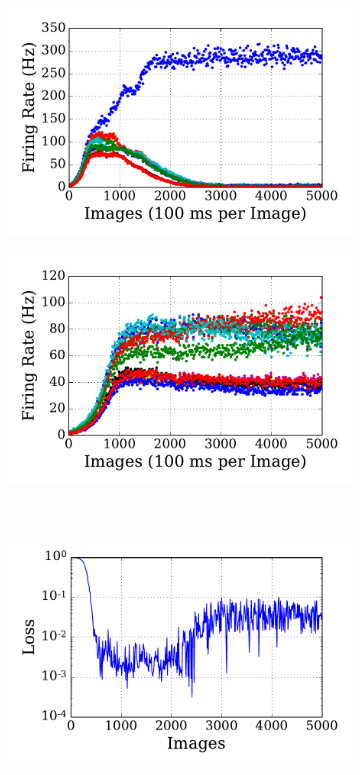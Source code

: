 \begin{figure}
\begin{subfigure}[t]{0.48\textwidth}
		\includegraphics[width=\textwidth]{pics_sdlm/10_exp_SRBM_Orig/exp1_hid_s.pdf}
		\caption{}
	\end{subfigure}
	\begin{subfigure}[t]{0.48\textwidth}
		\includegraphics[width=\textwidth]{pics_sdlm/10_exp_SRBM_Orig/exp2_hid_s.pdf}
		\caption{}
	\end{subfigure}\\
	\begin{subfigure}[t]{0.48\textwidth}
		\includegraphics[width=\textwidth]{pics_sdlm/10_exp_SRBM_Orig/exp1_mse_nons.pdf}

\end{subfigure}
\end{figure}

